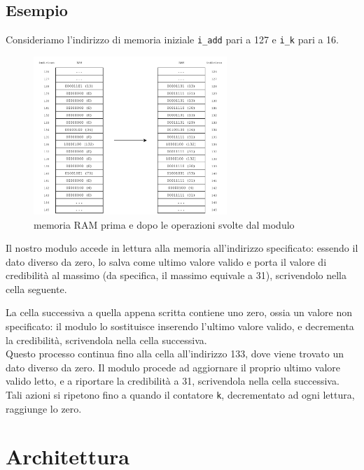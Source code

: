 \documentclass{article}
\begin{document}
\vspace{0.5cm}
\subsection{Esempio}
Consideriamo l'indirizzo di memoria iniziale \texttt{i\_add} pari a 127 e \texttt{i\_k} pari a 16.

\begin{figure}[h]
    \centering
    \includegraphics[width=0.65\textwidth]{example.png}
    \caption[short]{memoria RAM prima e dopo le operazioni svolte dal modulo}
\end{figure}

\bigskip
Il nostro modulo accede in lettura alla memoria all'indirizzo specificato: essendo il dato diverso da zero, lo salva come ultimo valore valido e porta il valore di credibilità al massimo (da specifica, il massimo equivale a 31), scrivendolo nella cella seguente.

\newpage
La cella successiva a quella appena scritta contiene uno zero, ossia un valore non specificato: il modulo lo sostituisce inserendo l'ultimo valore valido, e decrementa la credibilità, scrivendola nella cella successiva. 
\bigskip \\ Questo processo continua fino alla cella all'indirizzo 133, dove viene trovato un dato diverso da zero. Il modulo procede ad aggiornare il proprio ultimo valore valido letto, e a riportare la credibilità a 31, scrivendola nella cella successiva.
\bigskip \\ Tali azioni si ripetono fino a quando il contatore \texttt{k}, decrementato ad ogni lettura, raggiunge lo zero.



\newpage
\section{Architettura}
\end{document}
